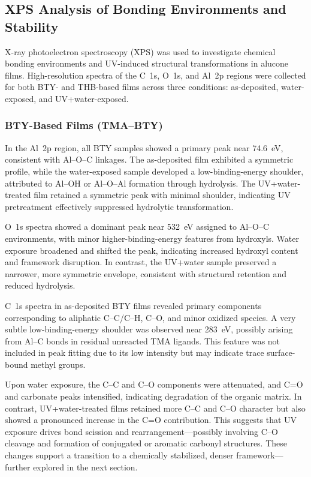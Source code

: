 \subsection{XPS Analysis of Bonding Environments and Stability}

X-ray photoelectron spectroscopy (XPS) was used to investigate chemical bonding environments and UV-induced structural transformations in alucone films. High-resolution spectra of the C~1s, O~1s, and Al~2p regions were collected for both BTY- and THB-based films across three conditions: as-deposited, water-exposed, and UV+water-exposed.

\subsubsection*{BTY-Based Films (TMA–BTY)}

In the Al~2p region, all BTY samples showed a primary peak near 74.6~eV, consistent with Al–O–C linkages. The as-deposited film exhibited a symmetric profile, while the water-exposed sample developed a low-binding-energy shoulder, attributed to Al–OH or Al–O–Al formation through hydrolysis. The UV+water-treated film retained a symmetric peak with minimal shoulder, indicating UV pretreatment effectively suppressed hydrolytic transformation.

O~1s spectra showed a dominant peak near 532~eV assigned to Al–O–C environments, with minor higher-binding-energy features from hydroxyls. Water exposure broadened and shifted the peak, indicating increased hydroxyl content and framework disruption. In contrast, the UV+water sample preserved a narrower, more symmetric envelope, consistent with structural retention and reduced hydrolysis.

C~1s spectra in as-deposited BTY films revealed primary components corresponding to aliphatic C–C/C–H, C–O, and minor oxidized species. A very subtle low-binding-energy shoulder was observed near 283~eV, possibly arising from Al–C bonds in residual unreacted TMA ligands. This feature was not included in peak fitting due to its low intensity but may indicate trace surface-bound methyl groups.

Upon water exposure, the C–C and C–O components were attenuated, and C=O and carbonate peaks intensified, indicating degradation of the organic matrix. In contrast, UV+water-treated films retained more C–C and C–O character but also showed a pronounced increase in the C=O contribution. This suggests that UV exposure drives bond scission and rearrangement—possibly involving C–O cleavage and formation of conjugated or aromatic carbonyl structures. These changes support a transition to a chemically stabilized, denser framework—further explored in the next section.

